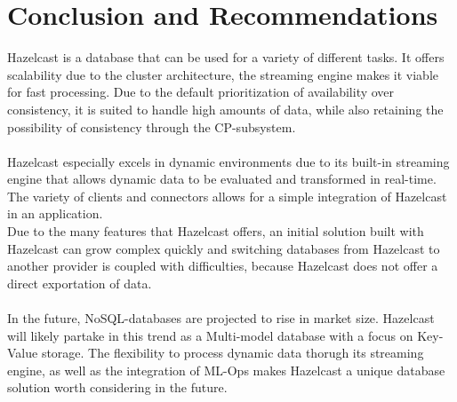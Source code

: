 
\section{Conclusion and Recommendations}
Hazelcast is a database that can be used for a variety of different tasks. It offers scalability due to the cluster architecture, the streaming engine makes it viable for fast processing. Due to the default prioritization of availability over consistency, it is suited to handle high amounts of data, while also retaining the possibility of consistency through the CP-subsystem.\\
\\
Hazelcast especially excels in dynamic environments due to its built-in streaming engine that allows dynamic data to be evaluated and transformed in real-time. The variety of clients and connectors allows for a simple integration of Hazelcast in an application.\\
Due to the many features that Hazelcast offers, an initial solution built with Hazelcast can grow complex quickly and switching databases from Hazelcast to another provider is coupled with difficulties, because Hazelcast does not offer a direct exportation of data.\\
\\
In the future, NoSQL-databases are projected to rise in market size. Hazelcast will likely partake in this trend as a Multi-model database with a focus on Key-Value storage. The flexibility  to process dynamic data thorugh its streaming engine, as well as the integration of ML-Ops makes Hazelcast a unique database solution worth considering in the future.
\nocite{*}